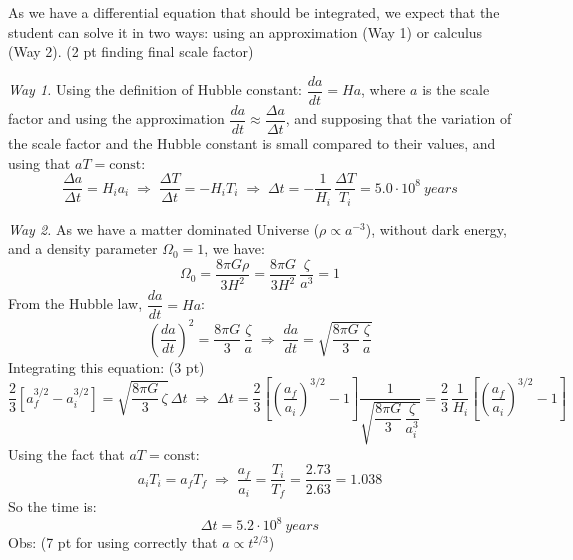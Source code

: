 As we have a differential equation that should be integrated, we expect that
the student can solve it in two ways: using an approximation (Way 1) or
calculus (Way 2). \hfill(2 pt finding final scale factor)

\medskip
\noindent\textit{Way 1.}
Using the definition of Hubble constant:
$\dfrac{da}{dt} = Ha$, where $a$ is the scale factor and using the
approximation $\dfrac{da}{dt} \approx \dfrac{\Delta a}{\Delta t}$, and
supposing that the variation of the scale factor and the Hubble constant is
small compared to their values, and using that $aT = \mathrm{const}$:
\begin{equation*}
\frac{\Delta a}{\Delta t} = H_i a_i
\;\Rightarrow\;
\frac{\Delta T}{\Delta t} = -H_i T_i
\;\Rightarrow\;
\Delta t = -\frac{1}{H_i}\,\frac{\Delta T}{T_i} = 5.0\cdot10^{8}~years
\tag*{(7 pt + 1 pt)}
\end{equation*}

\medskip
\noindent\textit{Way 2.}
As we have a matter dominated Universe ($\rho \propto a^{-3}$), without dark
energy, and a density parameter $\Omega_0 = 1$, we have:
\begin{equation*}
\Omega_0 = \frac{8\pi G\rho}{3H^2} = \frac{8\pi G}{3H^2}\,\frac{\zeta}{a^3} = 1
\tag*{(4 pt)}
\end{equation*}
From the Hubble law, $\dfrac{da}{dt} = Ha$:
\[
\left(\frac{da}{dt}\right)^{2} = \frac{8\pi G}{3}\,\frac{\zeta}{a}
\;\Rightarrow\;
\frac{da}{dt} = \sqrt{\frac{8\pi G}{3}\,\frac{\zeta}{a}}
\]
Integrating this equation: \hfill(3 pt)
\[
\frac{2}{3}\left[a_f^{3/2} - a_i^{3/2}\right]
= \sqrt{\frac{8\pi G}{3}\,\zeta}\,\Delta t
\;\Rightarrow\;
\Delta t
= \frac{2}{3}\left[\left(\frac{a_f}{a_i}\right)^{3/2} - 1\right]
  \frac{1}{\sqrt{\dfrac{8\pi G}{3}\,\dfrac{\zeta}{a_i^{3}}}}
= \frac{2}{3}\,\frac{1}{H_i}
  \left[\left(\frac{a_f}{a_i}\right)^{3/2} - 1\right]
\]
Using the fact that $aT = \mathrm{const}$:
\[
a_i T_i = a_f T_f
\;\Rightarrow\;
\frac{a_f}{a_i} = \frac{T_i}{T_f} = \frac{2.73}{2.63} = 1.038
\]
So the time is:
\begin{equation*}
\Delta t = 5.2\cdot10^{8}~years \tag*{(1 pt)}
\end{equation*}
Obs: (7 pt for using correctly that $a \propto t^{2/3}$)

